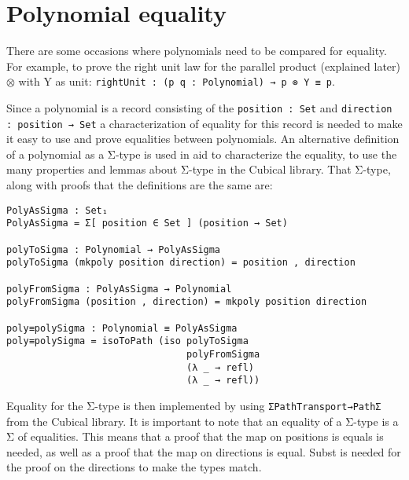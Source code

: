 \section{Polynomial equality}
There are some occasions where polynomials need to be compared for equality.
For example, to prove the right unit law for the parallel product (explained later) $\otimes$ with Y as unit: \texttt{rightUnit : (p q : Polynomial) → p ⊗ Y ≡ p}.

Since a polynomial is a record consisting of the \texttt{position : Set} and \newline \texttt{direction : position → Set} a characterization of equality for this record is needed to make it easy to use and prove equalities between polynomials.
An alternative definition of a polynomial as a Σ-type is used in aid to characterize the equality, to use the many properties and lemmas about Σ-type in the Cubical library.
That Σ-type, along with proofs that the definitions are the same are:

\begin{verbatim}
PolyAsSigma : Set₁
PolyAsSigma = Σ[ position ∈ Set ] (position → Set)

polyToSigma : Polynomial → PolyAsSigma
polyToSigma (mkpoly position direction) = position , direction
    
polyFromSigma : PolyAsSigma → Polynomial
polyFromSigma (position , direction) = mkpoly position direction

poly≡polySigma : Polynomial ≡ PolyAsSigma
poly≡polySigma = isoToPath (iso polyToSigma 
                                polyFromSigma 
                                (λ _ → refl) 
                                (λ _ → refl))
\end{verbatim}

Equality for the Σ-type is then implemented by using \texttt{ΣPathTransport→PathΣ} from the Cubical library.
It is important to note that an equality of a Σ-type is a Σ of equalities.
This means that a proof that the map on positions is equals is needed, as well as a proof that the map on directions is equal.
Subst is needed for the proof on the directions to make the types match.


